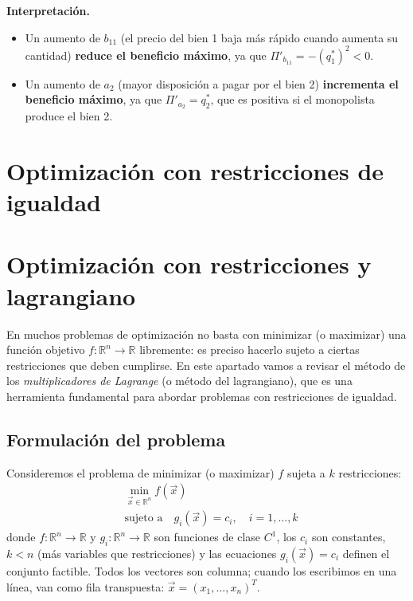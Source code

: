 \documentclass{article}
\newcommand{\R}{\ensuremath{\mathbb{R}}}
\newcommand{\vect}[1]{\vec{#1}}
\begin{document}
\textbf{Interpretación.}
\begin{itemize}
  \item Un aumento de \(b_{11}\) (el precio del bien 1 baja más rápido cuando aumenta su cantidad) \textbf{reduce el beneficio máximo}, ya que \(\Pi'_{b_{11}}=-(q_1^*)^2<0\).
  \item Un aumento de \(a_2\) (mayor disposición a pagar por el bien 2) \textbf{incrementa el beneficio máximo}, ya que \(\Pi'_{a_2}=q_2^*\), que es positiva si el monopolista produce el bien 2.
\end{itemize}



\newpage


\section{Optimización con restricciones de igualdad}\label{cap:igualdad}

\section*{Optimización con restricciones y lagrangiano}

En muchos problemas de optimización no basta con minimizar (o maximizar) una función objetivo \(f\colon\R^n\to\R\) libremente: es preciso hacerlo sujeto a ciertas restricciones que deben cumplirse. En este apartado vamos a revisar el método de los \emph{multiplicadores de Lagrange} (o método del lagrangiano), que es una herramienta fundamental para abordar problemas con restricciones de igualdad.

\subsection*{Formulación del problema}

Consideremos el problema de minimizar (o maximizar) \(f\) sujeta a \(k\) restricciones:
\[
\begin{aligned}
&\min_{\vect{x}\in\R^n} f(\vect{x})\\
&\text{sujeto a}\quad g_i(\vect{x})=c_i,\quad i=1,\dots,k
\end{aligned}
\]
donde \(f\colon\R^n\to\R\) y \(g_i\colon\R^n\to\R\) son funciones de clase \(C^1\), los \(c_i\) son constantes, \(k<n\) (más variables que restricciones) y las ecuaciones \(g_i(\vect{x})=c_i\) definen el conjunto factible. Todos los vectores son columna; cuando los escribimos en una línea, van como fila transpuesta: \(\vect{x}=(x_1,\dots,x_n)^T\).
\end{document}
